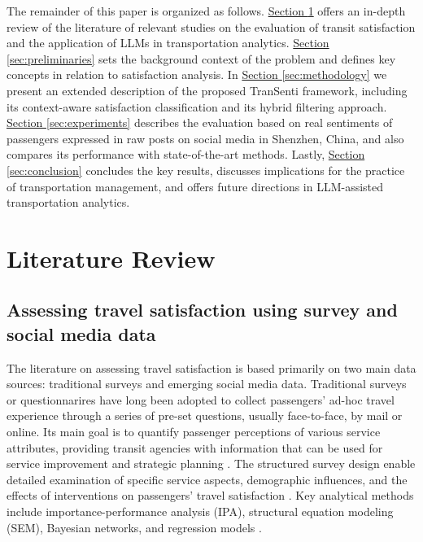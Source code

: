 \documentclass[a4paper,fleqn,12pt]{cas-sc}
\begin{document}
The remainder of this paper is organized as follows. \hyperref[sec:liter]{Section \ref{sec:liter}} offers an in-depth review of the literature of relevant studies on the evaluation of transit satisfaction and the application of LLMs in transportation analytics. \hyperref[sec:preliminaries]{Section \ref{sec:preliminaries}} sets the background context of the problem and defines key concepts in relation to satisfaction analysis. In \hyperref[sec:methodology]{Section \ref{sec:methodology}} we present an extended description of the proposed TranSenti framework, including its context-aware satisfaction classification and its hybrid filtering approach.  \hyperref[sec:experiments]{Section \ref{sec:experiments}} describes the evaluation based on real sentiments of passengers expressed in raw posts on social media in Shenzhen, China, and also compares its performance with state-of-the-art methods. Lastly, \hyperref[sec:conclusion]{Section \ref{sec:conclusion}} concludes the key results, discusses implications for the practice of transportation management, and offers future directions in LLM-assisted transportation analytics.

\section{Literature Review}\label{sec:liter}

\subsection{Assessing travel satisfaction using survey and social media data}
The literature on assessing travel satisfaction is based primarily on two main data sources: traditional surveys and emerging social media data. Traditional surveys or questionnarires have long been adopted to collect passengers' ad-hoc travel experience through a series of pre-set questions, usually face-to-face, by mail or online. Its main goal is to quantify passenger perceptions of various service attributes, providing transit agencies with information that can be used for service improvement and strategic planning \citep{he2017impact}. The structured survey design enable detailed examination of specific service aspects, demographic influences, and the effects of interventions on passengers' travel satisfaction \citep{yuan2019ass, pan2024sat}. Key analytical methods include importance-performance analysis (IPA), structural equation modeling (SEM), Bayesian networks, and regression models \citep{luo2023influential}.
\end{document}
